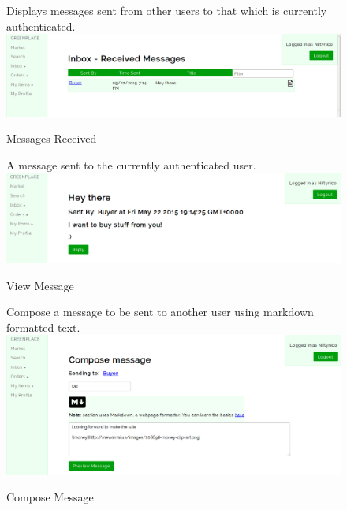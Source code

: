 \documentclass[letterpaper, 10 pt, conference]{ieeeconf}  %
\begin{document}
\begin{figure}[H]
  \caption{Messages Received}
  Displays messages sent from other users to that which is currently authenticated.\\
  \label{fig:receivedmessages}
  \centering
    \includegraphics[width=\textwidth]{images/inbox-received.png}
\end{figure}

\begin{figure}[H]
  \caption{View Message}
  A message sent to the currently authenticated user.\\
  \label{fig:message}
  \centering
    \includegraphics[width=\textwidth]{images/message.png}
\end{figure}

\begin{figure}[H]
  \caption{Compose Message}
  Compose a message to be sent to another user using markdown formatted text.\\
  \label{fig:composemessage}
  \centering
    \includegraphics[width=\textwidth]{images/composemessage.png}
\end{figure}
\end{document}
